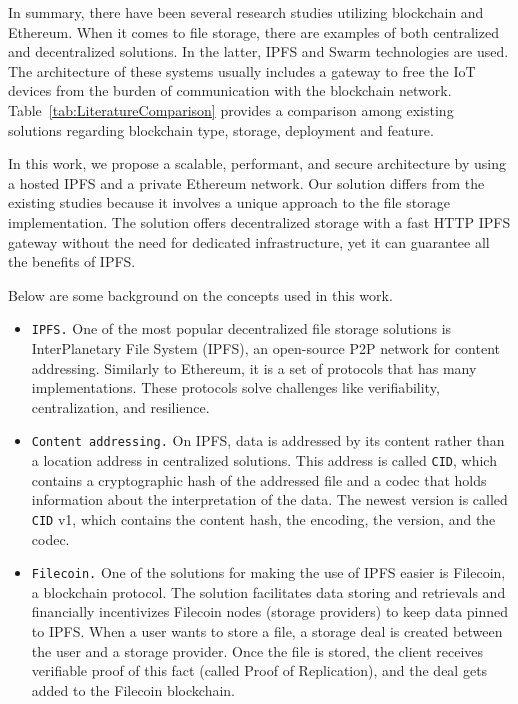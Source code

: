 \documentclass[conference]{IEEEtran}
\begin{document}

In summary, there have been several research studies utilizing blockchain and Ethereum. When it comes to file storage, there are examples of both centralized and decentralized solutions. In the latter, IPFS and Swarm technologies are used. The architecture of these systems usually includes a gateway to free the IoT devices from the burden of communication with the blockchain network. Table~\ref{tab:LiteratureComparison} provides a comparison among existing solutions regarding blockchain type, storage, deployment and feature.

In this work, we propose a scalable, performant, and secure architecture by using a hosted IPFS and a private Ethereum network. Our solution differs from the existing studies because it involves a unique approach to the file storage implementation. The solution offers decentralized storage with a fast HTTP IPFS gateway without the need for dedicated infrastructure, yet it can guarantee all the benefits of IPFS. 

Below are some background on the concepts used in this work.

\begin{itemize}
\item \texttt{IPFS.} One of the most popular decentralized file storage solutions is  InterPlanetary File System (IPFS), an open-source P2P network for content addressing. Similarly to Ethereum, it is a set of protocols that has many implementations. These protocols solve challenges like verifiability, centralization, and resilience.
    
\item \texttt{Content addressing.} On IPFS, data is addressed by its content rather than a location address in centralized solutions. This address is called \texttt{CID}, which contains a cryptographic hash of the addressed file and a codec that holds information about the interpretation of the data. The newest version is called \texttt{CID} v1, which contains the content hash, the encoding, the version, and the codec.

\item \texttt{Filecoin.} One of the solutions for making the use of IPFS easier is Filecoin, a blockchain protocol. The solution facilitates data storing and retrievals and financially incentivizes Filecoin nodes (storage providers) to keep data pinned to IPFS. When a user wants to store a file, a storage deal is created between the user and a storage provider. Once the file is stored, the client receives verifiable proof of this fact (called Proof of Replication), and the deal gets added to the Filecoin blockchain. 
\end{itemize}
\end{document}
